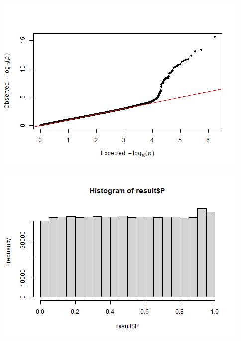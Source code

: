 \documentclass[
]{article}
\newenvironment{Shaded}{\begin{snugshade}}{\end{snugshade}}
\newcommand{\DataTypeTok}[1]{\textcolor[rgb]{0.13,0.29,0.53}{#1}}
\newcommand{\DecValTok}[1]{\textcolor[rgb]{0.00,0.00,0.81}{#1}}
\newcommand{\KeywordTok}[1]{\textcolor[rgb]{0.13,0.29,0.53}{\textbf{#1}}}
\newcommand{\NormalTok}[1]{#1}
\newcommand{\OperatorTok}[1]{\textcolor[rgb]{0.81,0.36,0.00}{\textbf{#1}}}
\begin{document}
\begin{Shaded}
\end{Shaded}

\includegraphics{stats-gene-research-progress-v8_files/figure-latex/unnamed-chunk-4-2.png}

\begin{Shaded}
\end{Shaded}

\includegraphics{stats-gene-research-progress-v8_files/figure-latex/unnamed-chunk-4-3.png}
\end{document}
